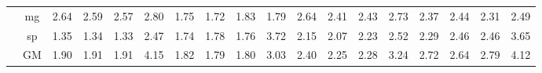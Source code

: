 \begin{table*}[]
\begin{center}
{\begin{tabular}{|c|c|rrrr|rrrr|rrrr|rrrr|}
 &  mg  &  2.64  & \cellcolor{blue!25} 2.59  & \cellcolor{blue!25} 2.57  &   2.80  &  1.75  & \cellcolor{blue!25} 1.72  &  1.83  &  1.79  &  2.64  & \cellcolor{blue!25} 2.41  &  2.43  &  2.73  &  2.37  &  2.44  & \cellcolor{blue!25} 2.31  &  2.49 \\
 &  sp  &  1.35  & \cellcolor{blue!25} 1.34  & \cellcolor{blue!25} 1.33  &   2.47  &  1.74  &  1.78  & \cellcolor{blue!25} 1.76  &  3.72  &  2.15  & \cellcolor{blue!25} 2.07  &  2.23  &  2.52  &  2.29  &  2.46  &  2.46  &  3.65 \\
 &  GM  &  1.90  &  1.91  &  1.91  &   4.15  &  1.82  & \cellcolor{blue!25} 1.79  &  1.80  &  3.03  &  2.40  & \cellcolor{blue!25} 2.25  &  2.28  &  3.24  &  2.72  & \cellcolor{blue!25} 2.64  &  2.79  &  4.12 \\
\hline 
\end{tabular} }

\end{center}
\end{table*}
